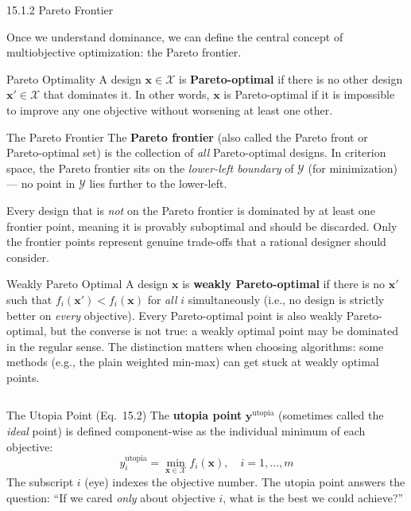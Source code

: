 \documentclass[aspectratio=169,10pt]{beamer}
\newcommand{\bx}{\mathbf{x}}
\newcommand{\by}{\mathbf{y}}
\begin{document}
\begin{frame}[allowframebreaks]{15.1.2 Pareto Frontier}

Once we understand dominance, we can define the central concept of
multiobjective optimization: the Pareto frontier.

\begin{block}{Pareto Optimality}
  A design $\bx \in \mathcal{X}$ is \textbf{Pareto-optimal} if there is no
  other design $\bx' \in \mathcal{X}$ that dominates it.  In other words,
  $\bx$ is Pareto-optimal if it is impossible to improve any one objective
  without worsening at least one other.
\end{block}

\begin{block}{The Pareto Frontier}
  The \textbf{Pareto frontier} (also called the Pareto front or Pareto-optimal
  set) is the collection of \emph{all} Pareto-optimal designs.  In criterion
  space, the Pareto frontier sits on the \emph{lower-left boundary} of
  $\mathcal{Y}$ (for minimization) --- no point in $\mathcal{Y}$ lies further
  to the lower-left.
\end{block}

Every design that is \emph{not} on the Pareto frontier is dominated by at least
one frontier point, meaning it is provably suboptimal and should be discarded.
Only the frontier points represent genuine trade-offs that a rational designer
should consider.

\begin{block}{Weakly Pareto Optimal}
  A design $\bx$ is \textbf{weakly Pareto-optimal} if there is no $\bx'$ such
  that $f_i(\bx') < f_i(\bx)$ for \emph{all} $i$ simultaneously (i.e., no
  design is strictly better on \emph{every} objective).  Every Pareto-optimal
  point is also weakly Pareto-optimal, but the converse is not true: a weakly
  optimal point may be dominated in the regular sense.  The distinction matters
  when choosing algorithms: some methods (e.g., the plain weighted min-max)
  can get stuck at weakly optimal points.
\end{block}

\begin{columns}
\begin{block}{The Utopia Point (Eq.\ 15.2)}
  The \textbf{utopia point} $\by^{\mathrm{utopia}}$ (sometimes called the
  \emph{ideal} point) is defined component-wise as the individual minimum of
  each objective:
  \[
    y_i^{\mathrm{utopia}} = \min_{\bx \in \mathcal{X}} f_i(\bx),
    \quad i = 1, \ldots, m
  \]
  The subscript $i$ (eye) indexes the objective number.  The utopia point
  answers the question: ``If we cared \emph{only} about objective $i$, what
  is the best we could achieve?''
\end{block}


\end{columns}
\end{frame}
\end{document}
